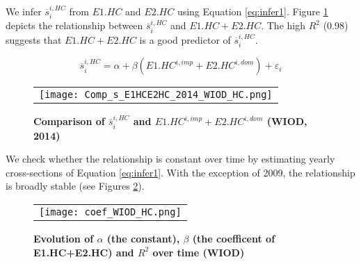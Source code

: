 \documentclass[11pt,a4paper]{paper} %
\begin{document}
%
%
We infer $\overline{s}_{i}^{i,HC}$ from $E1.HC$ and $E2.HC$ using Equation \ref{eq:infer1}.
Figure \ref{fig:ratiodir_WIOD} depicts the relationship between $\overline{s}_{i}^{i,HC}$ and $E1.HC+E2.HC$. 
The high $R^2$ (0.98) suggests that $E1.HC+E2.HC$ is a good predictor of $\overline{s}_{i}^{i,HC}$. 

 \begin{equation}
\overline{s}_{i}^{i,HC}=\alpha + \beta  \left(E1.HC^{i,imp}+E2.HC^{i,dom}\right) +\varepsilon_i 
\label{eq:infer1}
 \end{equation}
 


\begin{figure}[H]
\centering
\caption{\footnotesize{\textbf{Comparison of $\overline{s}_{i}^{i,HC}$ and $E1.HC^{i,imp}+E2.HC^{i,dom}$ (WIOD, 2014)}}}
\begin{tabular}{c}
\texttt{[image: Comp\_s\_E1HCE2HC\_2014\_WIOD\_HC.png]}\\
\end{tabular}
\label{fig:ratiodir_WIOD}
\end{figure}

We check whether the relationship is constant over time by estimating yearly cross-sections of Equation \ref{eq:infer1}. 
With the exception of 2009, the relationship is broadly stable (see Figures \ref{fig:evolution_coef}).

\begin{figure}[H]
\centering
\caption{\footnotesize{\textbf{Evolution of  $\alpha$ (the constant), $\beta$ (the coefficent of E1.HC+E2.HC) and $R^2$ over time (WIOD)}}}
\begin{tabular}{c}
\texttt{[image: coef\_WIOD\_HC.png]}\\
\end{tabular}
\label{fig:evolution_coef}
\end{figure}
\end{document}
